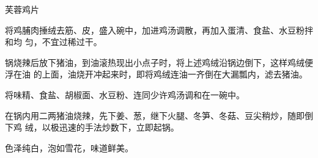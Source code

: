 %
%
%
%
%
%
%
\begin{recipe}{芙蓉鸡片}

\ingredients


\preparation

将鸡脯肉捶绒去筋、皮，盛入碗中，加进鸡汤调散，再加入蛋清、食盐、水豆粉拌和均
匀，不宜过稀过干。

锅烧辣后放下猪油，到油滚热现出小点子时，将上述鸡绒沿锅边倒下，这样鸡绒便浮在油
的上面，油烧开冲起来时，即将鸡绒连油一齐倒在大漏瓢内，滤去猪油。

将味精、食盐、胡椒面、水豆粉、连同少许鸡汤调和在一碗中。

在锅内用二两猪油烧辣，先下姜、葱，继下火腿、冬笋、冬菇、豆尖稍炒，随即倒下鸡
绒，以极迅速的手法炒数下，立即起锅。

\features

色泽纯白，泡如雪花，味道鲜美。

\end{recipe}

